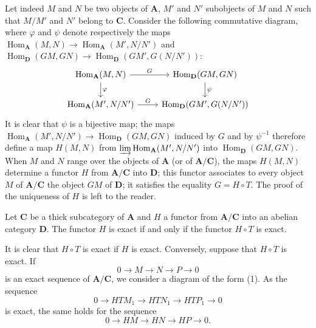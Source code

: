 Let indeed $M$ and $N$ be two objects of $\mathbf A$, $M'$ and $N'$
subobjects of $M$ and $N$ such that $M/M'$ and $N'$ belong to
$\mathbf C$. Consider the following commutative diagram, where
$\varphi$ and $\psi$ denote respectively the maps
$\operatorname{Hom}_{\mathbf A}(M,N)\to
\operatorname{Hom}_{\mathbf A}(M',N/N')$ and
$\operatorname{Hom}_{\mathbf D}(GM,GN)\to
\operatorname{Hom}_{\mathbf D}(GM',G(N/N'))$:
\[
\begin{tikzcd}
\operatorname{Hom}_{\mathbf A}(M,N) \arrow[r, "G"] \arrow[d, "\varphi"] &
\operatorname{Hom}_{\mathbf D}(GM,GN) \arrow[d, "\psi"] \\
\operatorname{Hom}_{\mathbf A}(M',N/N') \arrow[r, "G"] &
\operatorname{Hom}_{\mathbf D}(GM',G(N/N'))
\end{tikzcd}
\]
It is clear that $\psi$ is a bijective map; the maps
$\operatorname{Hom}_{\mathbf A}(M',N/N')\to
\operatorname{Hom}_{\mathbf D}(GM,GN)$ induced by $G$ and by
$\psi^{-1}$ therefore define a map $H(M,N)$ from
$\varinjlim \operatorname{Hom}_{\mathbf A}(M',N/N')$ into
$\operatorname{Hom}_{\mathbf D}(GM,GN)$. When $M$ and $N$ range over
the objects of $\mathbf A$ (or of $\mathbf A/\mathbf C$), the
maps $H(M,N)$ determine a functor $H$ from
$\mathbf A/\mathbf C$ into $\mathbf D$; this functor associates to
every object $M$ of $\mathbf A/\mathbf C$ the object $GM$ of
$\mathbf D$; it satisfies the equality $G=H\circ T$. The proof of the
uniqueness of $H$ is left to the reader.

\begin{corollary}
Let $\mathbf C$ be a thick subcategory of $\mathbf A$ and $H$ a functor
from $\mathbf A/\mathbf C$ into an abelian category $\mathbf D$. The
functor $H$ is exact if and only if the functor $H\circ T$ is exact.
\end{corollary}

It is clear that $H\circ T$ is exact if $H$ is exact. Conversely,
suppose that $H\circ T$ is exact. If
\[
0 \to M \to N \to P \to 0
\]
is an exact sequence of $\mathbf A/\mathbf C$, we consider a diagram
of the form (1). As the sequence
\[
0 \to HTM_1 \to HTN_1 \to HTP_1 \to 0
\]
is exact, the same holds for the sequence
\[
0 \to HM \to HN \to HP \to 0.
\]